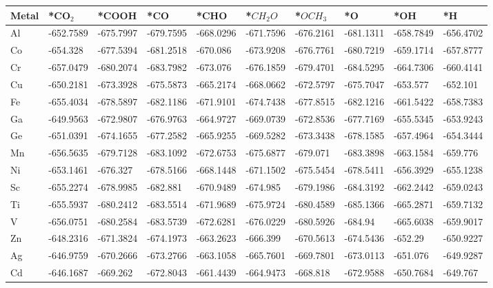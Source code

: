 \begin{table}[h]
    \centering
    {\fontsize{6}{12}\selectfont %
    \begin{tabular}{*{10}{l}}
      \hline
      Metal & *CO$_2$ & *COOH & *CO & *CHO & *$CH_2O$ & *$OCH_3$ & *O & *OH & *H \\
      \hline
      Al	& -652.7589	&-675.7997	&-679.7595	&-668.0296	&-671.7596	&-676.2161	&-681.1311	&-658.7849	&-656.4702 \\
      Co	& -654.328  &-677.5394	&-681.2518	&-670.086	  &-673.9208	&-676.7761	&-680.7219	&-659.1714	&-657.8777 \\
      Cr	& -657.0479	&-680.2074	&-683.7982	&-673.076	  &-676.1859	&-679.4701	&-684.5295	&-664.7306	&-660.4141 \\
      Cu	& -650.2181	&-673.3928	&-675.5873	&-665.2174	&-668.0662	&-672.5797	&-675.7047	&-653.577	  &-652.101  \\
      Fe	& -655.4034	&-678.5897	&-682.1186	&-671.9101	&-674.7438	&-677.8515	&-682.1216	&-661.5422	&-658.7383 \\
      Ga	& -649.9563	&-672.9807	&-676.9763	&-664.9727	&-669.0739	&-672.8536	&-677.7169	&-655.5345	&-653.9243 \\
      Ge	& -651.0391	&-674.1655	&-677.2582	&-665.9255	&-669.5282	&-673.3438	&-678.1585	&-657.4964	&-654.3444 \\
      Mn	& -656.5635	&-679.7128	&-683.1092	&-672.6753	&-675.6877	&-679.071	  &-683.3898	&-663.1584	&-659.776  \\
      Ni	& -653.1461	&-676.327	  &-678.5166	&-668.1448	&-671.1502	&-675.5454	&-678.5411	&-656.3929	&-655.1238 \\
      Sc	& -655.2274	&-678.9985	&-682.881	  &-670.9489	&-674.985	  &-679.1986	&-684.3192	&-662.2442	&-659.0243 \\
      Ti	& -655.5937	&-680.2412	&-683.5514	&-671.9689	&-675.9724	&-680.4589	&-685.1366	&-665.2871	&-659.7132 \\
      V	  & -656.0751	&-680.2584	&-683.5739	&-672.6281	&-676.0229	&-680.5926	&-684.94		&-665.6038	&-659.9017 \\
      Zn	& -648.2316	&-671.3824	&-674.1973	&-663.2623	&-666.399  	&-670.5613	&-674.5436	&-652.29	  &-650.9227 \\
      Ag	& -646.9759	&-670.2666	&-673.2766	&-663.1058	&-665.7601	&-669.7801	&-673.0113	&-651.076	  &-649.9287 \\
      Cd	& -646.1687	&-669.262	  &-672.8043	&-661.4439	&-664.9473	&-668.818	  &-672.9588	&-650.7684	&-649.767  \\

\end{tabular}}
\end{table}
